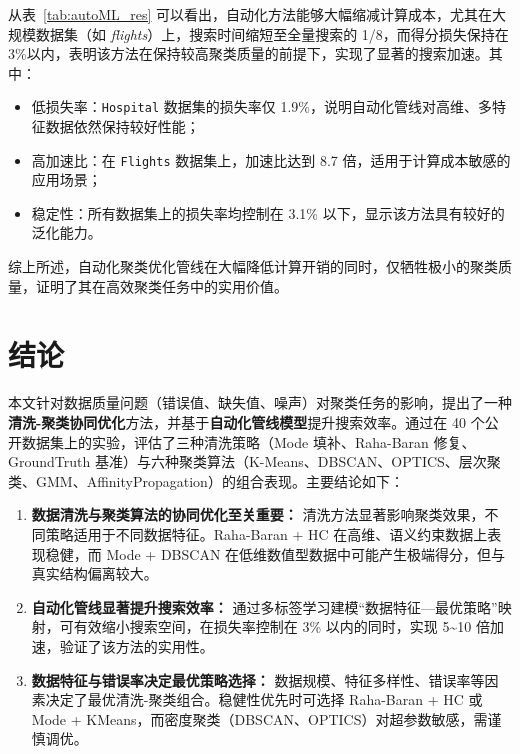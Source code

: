 \documentclass[10pt]{article} %
\numberwithin{equation}{section}
\begin{document}
\noindent
从表~\ref{tab:autoML_res} 可以看出，自动化方法能够大幅缩减计算成本，尤其在大规模数据集（如 \textit{flights}）上，搜索时间缩短至全量搜索的 1/8，而得分损失保持在 3\%以内，表明该方法在保持较高聚类质量的前提下，实现了显著的搜索加速。其中：
\begin{itemize}
    \item 低损失率：\texttt{Hospital} 数据集的损失率仅 1.9\%，说明自动化管线对高维、多特征数据依然保持较好性能；
    \item 高加速比：在 \texttt{Flights} 数据集上，加速比达到 8.7 倍，适用于计算成本敏感的应用场景；
    \item 稳定性：所有数据集上的损失率均控制在 3.1\% 以下，显示该方法具有较好的泛化能力。
\end{itemize}

\noindent
综上所述，自动化聚类优化管线在大幅降低计算开销的同时，仅牺牲极小的聚类质量，证明了其在高效聚类任务中的实用价值。 


\section{结论}
\label{sec:conclusion}

本文针对数据质量问题（错误值、缺失值、噪声）对聚类任务的影响，提出了一种\textbf{清洗-聚类协同优化}方法，并基于\textbf{自动化管线模型}提升搜索效率。通过在 40 个公开数据集上的实验，评估了三种清洗策略（Mode 填补、Raha-Baran 修复、GroundTruth 基准）与六种聚类算法（K-Means、DBSCAN、OPTICS、层次聚类、GMM、AffinityPropagation）的组合表现。主要结论如下：

\begin{enumerate}
    \item \textbf{数据清洗与聚类算法的协同优化至关重要：}
    清洗方法显著影响聚类效果，不同策略适用于不同数据特征。Raha-Baran + HC 在高维、语义约束数据上表现稳健，而 Mode + DBSCAN 在低维数值型数据中可能产生极端得分，但与真实结构偏离较大。

    \item \textbf{自动化管线显著提升搜索效率：}  
    通过多标签学习建模“数据特征—最优策略”映射，可有效缩小搜索空间，在损失率控制在 3\% 以内的同时，实现 5\textasciitilde10 倍加速，验证了该方法的实用性。

    \item \textbf{数据特征与错误率决定最优策略选择：}  
    数据规模、特征多样性、错误率等因素决定了最优清洗-聚类组合。稳健性优先时可选择 Raha-Baran + HC 或 Mode + KMeans，而密度聚类（DBSCAN、OPTICS）对超参数敏感，需谨慎调优。
\end{enumerate}
\end{document}
